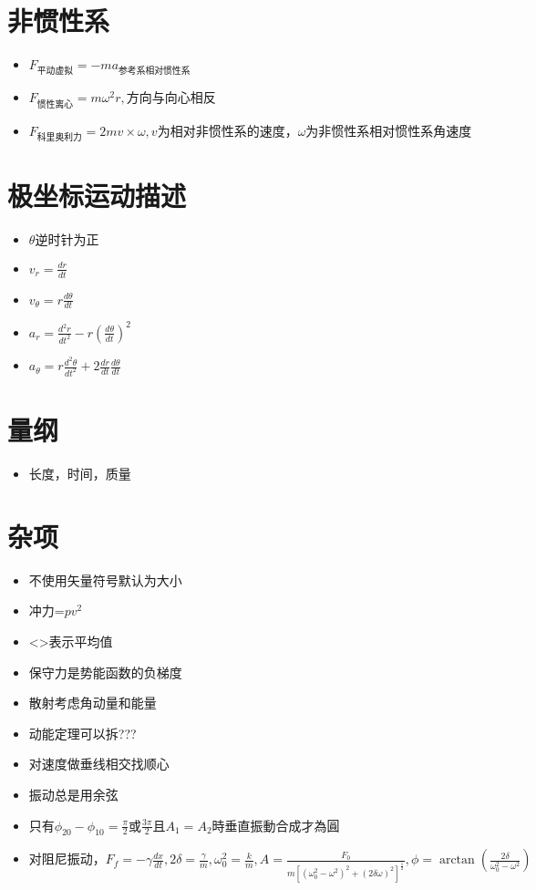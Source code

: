 \documentclass[]{article}
\begin{document}
\section{非惯性系}
\begin{itemize}
	\item $F_{平动虚拟}=-ma_{参考系相对惯性系}$
	\item $F_{惯性离心}=m\omega^{2}r,方向与向心相反$
	\item $F_{科里奥利力}=2mv\times \omega,v为相对非惯性系的速度，\omega 为非惯性系相对惯性系角速度$
\end{itemize}
\section{极坐标运动描述}
\begin{itemize}
	\item $\theta 逆时针为正$
	\item $v_{r}=\frac{dr}{dt}$
	\item $v_{\theta}=r\frac{d\theta}{dt}$
	\item $a_{r}=\frac{d^{2}r}{dt^{2}}-r(\frac{d\theta}{dt})^{2}$
	\item $a_{\theta}=r\frac{d^{2}\theta}{dt^{2}}+2\frac{dr}{dt} \frac{d\theta}{dt}$
	
\end{itemize}
\section{量纲}
\begin{itemize}
	\item 长度，时间，质量
\end{itemize}
\section{杂项}
\begin{itemize}
	\item 不使用矢量符号默认为大小
	\item 冲力=$pv^{2}$
	\item <>表示平均值
	\item 保守力是势能函数的负梯度
	\item 散射考虑角动量和能量
	\item 动能定理可以拆???
	\item 对速度做垂线相交找顺心
	\item 振动总是用余弦
	\item 只有$\phi_{20}-\phi_{10}=\frac{\pi}{2}或\frac{3\pi}{2}且A_{1}=A_{2}時垂直振動合成才為圓$
	\item $对阻尼振动，F_{f}=-\gamma \frac{dx}{dt},2\delta =\frac{\gamma}{m},\omega_{0}^{2}=\frac{k}{m},A=\frac{F_{0}}{m[(\omega_{0}^{2}-\omega^{2})^{2}+(2\delta \omega)^{2}]^{\frac{1}{2}}},\phi =\arctan(\frac{2\delta}{\omega^{2}_{0}-\omega^{2}})$
\end{itemize}
\end{document}
